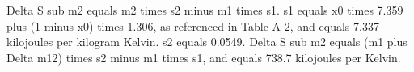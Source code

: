 Delta S sub m2 equals m2 times s2 minus m1 times s1. s1 equals x0 times 7.359 plus (1 minus x0) times 1.306, as referenced in Table A-2, and equals 7.337 kilojoules per kilogram Kelvin. s2 equals 0.0549. Delta S sub m2 equals (m1 plus Delta m12) times s2 minus m1 times s1, and equals 738.7 kilojoules per Kelvin.